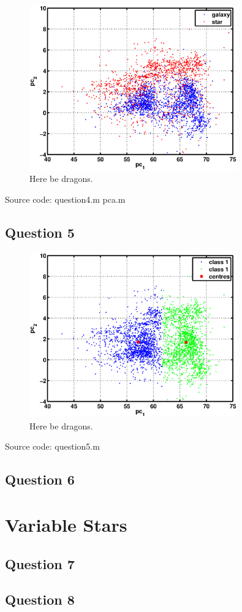 \documentclass[a4paper, 11pt]{article}
\begin{document}
\begin{figure}[H]
    \centering
    \includegraphics[width=0.8\textwidth]{figures/question4_2}
    \caption{Here be dragons.}
    \label{fig:question4_2}
\end{figure}

Source code: question4.m pca.m

\subsection*{Question 5}

\begin{figure}[H]
    \centering
    \includegraphics[width=0.8\textwidth]{figures/question5_1}
    \caption{Here be dragons.}
    \label{fig:question5_1}
\end{figure}

Source code: question5.m

\subsection*{Question 6}


\section{Variable Stars} %
\label{sec:variable_stars}

\subsection*{Question 7}

\subsection*{Question 8}

\end{document}

